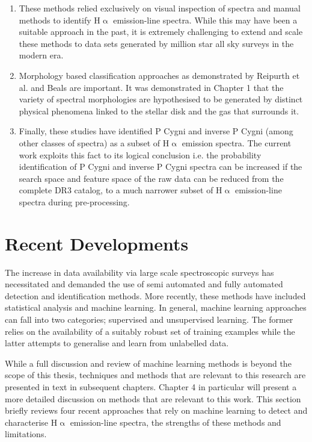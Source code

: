 \begin{enumerate}
\item These methods relied exclusively on visual inspection of spectra and manual methods to identify H$\upalpha$ emission-line spectra. While this may have been a suitable approach in the past, it is extremely challenging to extend and scale these methods to data sets generated by million star all sky surveys in the modern era.

\item Morphology based classification approaches as demonstrated by Reipurth et al. and Beals are important. It was demonstrated in Chapter 1 that the variety of spectral morphologies are hypothesised to be generated by distinct physical phenomena linked to the stellar disk and the gas that surrounds it.

\item Finally, these studies have identified P Cygni and inverse P Cygni (among other classes of spectra) as a subset of H$\upalpha$ emission spectra. The current work exploits this fact to its logical conclusion i.e. the probability identification of P Cygni and inverse P Cygni spectra can be increased if the search space and feature space of the raw data can be reduced from the complete DR3 catalog, to a much narrower subset of H$\upalpha$ emission-line spectra during pre-processing. 
\end{enumerate}

\section{Recent Developments}

The increase in data availability via large scale spectroscopic surveys has necessitated and demanded the use of semi automated and fully automated detection and identification methods. More recently, these methods have included statistical analysis and machine learning. In general, machine learning approaches can fall into two categories; supervised and unsupervised learning. The former relies on the availability of a suitably robust set of training examples while the latter attempts to generalise and learn from unlabelled data\cite{hastie2009elements}. 

While a full discussion and review of machine learning methods is beyond the scope of this thesis, techniques and methods that are relevant to this research are presented in text in subsequent chapters. Chapter 4 in particular will present a more detailed discussion on methods that are relevant to this work. This section briefly reviews four recent approaches that rely on machine learning to detect and characterise H$\upalpha$ emission-line spectra, the strengths of these methods and limitations.

